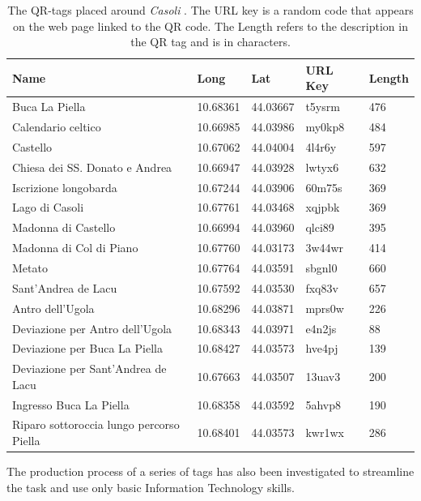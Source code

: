 \documentclass[sustainability,article,submit,pdftex,moreauthors]{Definitions/mdpi}
\begin{document}
\begin{table}
    \begin{tabular} {|>{\raggedright\arraybackslash}p{3cm}|l|l|l|l|}
        \hline 
        \textbf{Name} & \textbf{Long} & \textbf{Lat} & \textbf{URL Key} & \textbf{Length} \\ \hline
        Buca La Piella & 10.68361 & 44.03667 & t5ysrm & 476 \\ \hline
        Calendario celtico & 10.66985 & 44.03986 & my0kp8 & 484 \\ \hline
        Castello & 10.67062 & 44.04004 & 4l4r6y & 597 \\ \hline
        Chiesa dei SS. Donato e Andrea & 10.66947 & 44.03928 & lwtyx6 & 632 \\ \hline
        Iscrizione longobarda & 10.67244 & 44.03906 & 60m75s & 369 \\ \hline
        Lago di Casoli & 10.67761 & 44.03468 & xqjpbk & 369 \\ \hline
        Madonna di Castello & 10.66994 & 44.03960 & qlci89 & 395 \\ \hline
        Madonna di Col di Piano & 10.67760 & 44.03173 & 3w44wr & 414 \\ \hline
        Metato & 10.67764 & 44.03591 & sbgnl0 & 660 \\ \hline
        Sant'Andrea de Lacu & 10.67592 & 44.03530 & fxq83v & 657 \\ \hline
        Antro dell’Ugola & 10.68296 & 44.03871 & mprs0w & 226 \\ \hline
        Deviazione per Antro dell’Ugola & 10.68343 & 44.03971 & e4n2js & 88 \\ \hline
        Deviazione per Buca La Piella & 10.68427 & 44.03573 & hve4pj & 139 \\ \hline
        Deviazione per Sant’Andrea de Lacu & 10.67663 & 44.03507 & 13uav3 & 200 \\ \hline
        Ingresso Buca La Piella & 10.68358 & 44.03592 & 5ahvp8 & 190 \\ \hline
        Riparo sottoroccia lungo percorso Piella & 10.68401 & 44.03573 & kwr1wx & 286 \\    \hline
    \end{tabular}
\caption{The QR-tags placed around \emph{Casoli} . The URL key is a random code that appears on the web page linked to the QR code. The Length refers to the description in the QR tag and is in characters. \label{tab:qrtags}}
\end{table}

The production process of a series of tags has also been investigated to streamline the task and use only basic Information Technology skills.
\end{document}

